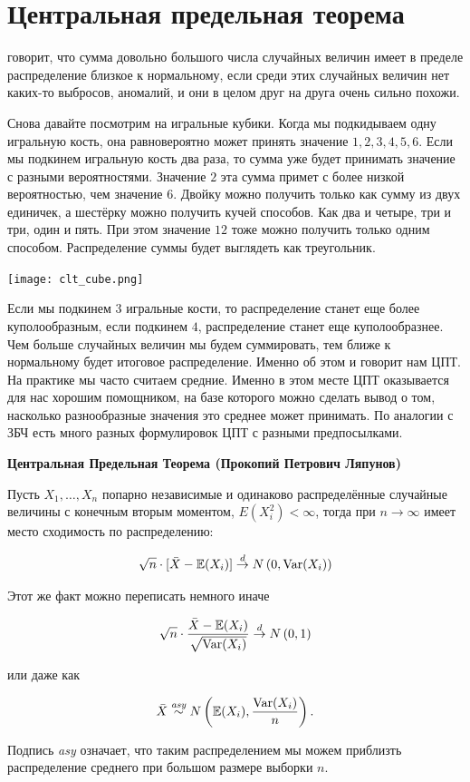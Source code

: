 \documentclass[12pt, a4paper, oneside]{article}
\begin{document}
\section{Центральная предельная теорема}

 говорит, что сумма довольно большого числа случайных величин имеет в пределе распределение близкое к нормальному, если среди этих случайных величин нет каких-то выбросов, аномалий, и они в целом друг на друга очень сильно похожи.

Снова давайте посмотрим на игральные кубики. Когда мы подкидываем одну игральную кость, она равновероятно может принять значение $1, 2, 3, 4, 5, 6$. Если мы подкинем игральную кость два раза, то сумма уже будет принимать значение с разными вероятностями.  Значение $2$ эта сумма примет с более низкой вероятностью, чем значение $6$. Двойку можно получить только как сумму из двух единичек, а шестёрку можно получить кучей способов. Как два и четыре, три и три, один и пять.  При этом значение $12$ тоже можно получить только одним способом. Распределение суммы будет выглядеть как треугольник. 

\begin{center} 
\texttt{[image: clt\_cube.png]}
\end{center} 

Если мы подкинем $3$ игральные кости, то распределение станет еще более куполообразным, если подкинем $4$, распределение станет еще куполообразнее. Чем больше случайных величин мы будем суммировать, тем ближе к нормальному будет итоговое распределение. Именно об этом и говорит нам ЦПТ. На практике мы часто считаем средние. Именно в этом месте ЦПТ оказывается для нас хорошим помощником, на базе которого можно сделать вывод о том, насколько разнообразные значения это среднее может принимать. По аналогии с ЗБЧ есть много разных формулировок ЦПТ с разными предпосылками. 

\begin{theorem}{\textbf{Центральная Предельная Теорема (Прокопий Петрович Ляпунов)}}

Пусть $X_1, \ldots, X_n$ попарно независимые и одинаково распределённые случайные величины с конечным вторым моментом, $E(X_i^2) < \infty$, тогда при $n \to \infty$ имеет место сходимость по распределению: 

\[\sqrt{n} \cdot [\bar X - \mathbb{E}(X_i)]  \overset{d}{\to} N \left(0, \operatorname{Var}(X_i)\right)\]

Этот же факт можно переписать немного иначе

\[\sqrt{n} \cdot \frac{\bar{X} - \mathbb{E}(X_i)}{\sqrt{\operatorname{Var}(X_i)}}  \overset{d}{\to} N \left(0, 1\right)\]

или даже как

$$
\bar{X} \overset{\text{\textit{asy}}}{\sim} N \left(\mathbb{E}(X_i), \frac{\operatorname{Var}(X_i)}{n} \right).
$$

Подпись \textit{asy} означает, что таким распределением мы можем приблизть распределение среднего при большом размере выборки $n$.
\end{theorem}
\end{document}
